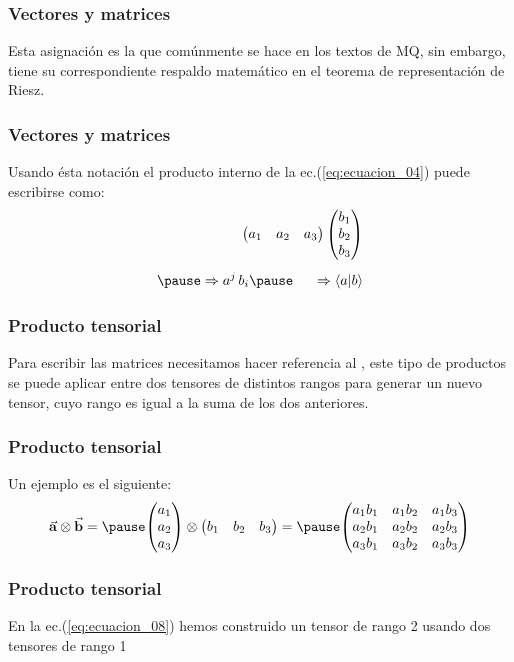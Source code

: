 \documentclass[12pt]{beamer}
\begin{document}
\begin{frame}
\frametitle{Vectores y matrices}
Esta asignación es la que comúnmente se hace en los textos de MQ, \pause sin embargo, tiene su correspondiente respaldo matemático en el teorema de representación de Riesz.
\end{frame}
\begin{frame}
\frametitle{Vectores y matrices}
Usando ésta notación el producto interno de la ec.(\ref{eq:ecuacion_04}) puede escribirse como:
\pause
\begin{eqnarray}
\begin{aligned}
\begin{pmatrix}
a_{1} & a_{2} & a_{3}
\end{pmatrix}
\begin{pmatrix}
b_{1} \\
b_{2} \\
b_{3}
\end{pmatrix} \\[0.5em] \pause
\Rightarrow a^{j} \, b_{i} \pause \hspace{0.5cm} \Rightarrow \braket{a}{b}
\label{eq:ecuacion_07}
\end{aligned}
\end{eqnarray}
\end{frame}
\begin{frame}
\frametitle{Producto tensorial}
Para escribir las matrices necesitamos hacer referencia al , \pause este tipo de productos se puede aplicar entre dos tensores de distintos rangos para generar un nuevo tensor, cuyo rango es igual a la suma de los dos anteriores.
\end{frame}
\begin{frame}
\frametitle{Producto tensorial}
Un ejemplo es el siguiente:
\pause
\begin{eqnarray}
\begin{aligned}
\va{a} \otimes \va{b} = \pause
\mqty(a_{1} \\ a_{2} \\ a_{3}) \otimes \mqty(b_{1} & b_{2} & b_{3}) = \pause \mqty(
a_{1} b_{1} & a_{1} b_{2} & a_{1} b_{3} \\
a_{2} b_{1} & a_{2} b_{2} & a_{2} b_{3} \\
a_{3} b_{1} & a_{3} b_{2} & a_{3} b_{3}
)
\end{aligned}
\label{eq:ecuacion_08}
\end{eqnarray}
\end{frame}
\begin{frame}
\frametitle{Producto tensorial}
En la ec.(\ref{eq:ecuacion_08}) hemos construido un tensor de rango 2 usando dos tensores de rango 1
\end{frame}
\end{document}
